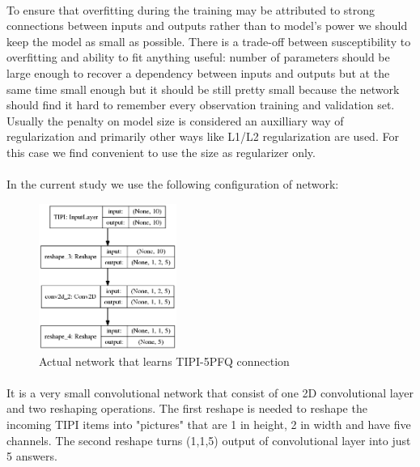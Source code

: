 \documentclass{llncs}
\begin{document}
\paragraph{}
To ensure that overfitting during the training may be attributed to strong connections between inputs and outputs rather than to model's power we should keep the model as small as possible. There is a trade-off between susceptibility to overfitting and ability to fit anything useful: number of parameters should be large enough to recover a dependency between inputs and outputs but at the same time small enough but it should be still pretty small because the network should find it hard to remember every observation training and validation set. Usually the penalty on model size is considered an auxilliary way of regularization and primarily other ways like L1/L2 regularization are used. For this case we find convenient to use the size as regularizer only.

\paragraph{}
In the current study we use the following configuration of network:
\begin{figure}[H]
	\centering
	\includegraphics[width=0.4\textwidth]{figures/tipinet.png}
	\caption{Actual network that learns TIPI-5PFQ connection}
	\label{fig:fig2}
\end{figure}
\paragraph{}
It is a very small convolutional network that consist of one 2D convolutional layer and two reshaping operations. The first reshape is needed to reshape the incoming TIPI items into "pictures" that are 1 in height, 2 in width and have five channels. The second reshape turns (1,1,5) output of convolutional layer into just 5 answers.
\end{document}
